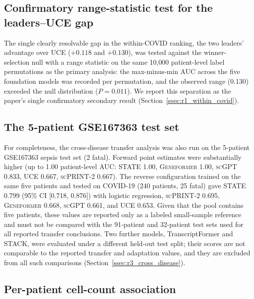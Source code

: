 \documentclass[11pt,a4paper]{article}
\newcommand{\model}[1]{\textsc{#1}}
\begin{document}
\subsection{Confirmatory range-statistic test for the leaders--UCE gap}
\label{sn:range_test}

The single clearly resolvable gap in the within-COVID ranking, the two
leaders' advantage over \model{UCE} ($+0.118$ and $+0.130$), was tested
against the winner-selection null with a range statistic on the same 10{,}000
patient-level label permutations as the primary analysis: the max-minus-min
AUC across the five foundation models was recorded per permutation, and the
observed range (0.130) exceeded the null distribution
($P = 0.011$). We report this separation as the paper's single confirmatory
secondary result (Section~\ref{ssec:r1_within_covid}).

\subsection{The 5-patient GSE167363 test set}
\label{sn:gse167363_testset}

For completeness, the cross-disease transfer analysis was also run on the
5-patient GSE167363 sepsis test set (2 fatal). Forward point estimates were
substantially higher (up to 1.00 patient-level AUC: \model{STATE} 1.00,
\model{Geneformer} 1.00, \model{scGPT} 0.833, \model{UCE} 0.667,
\model{scPRINT-2} 0.667). The reverse configuration trained on the same five
patients and tested on COVID-19 (240 patients, 25 fatal) gave \model{STATE}
0.799 (95\% CI [0.718, 0.876]) with logistic regression, \model{scPRINT-2}
0.695, \model{Geneformer} 0.668, \model{scGPT} 0.661, and \model{UCE} 0.653.
Given that the pool contains five patients, these values are reported only as
a labeled small-sample reference and must not be compared with the 91-patient
and 32-patient test sets used for all reported transfer conclusions. Two further
models, TranscriptFormer \citep{pearce2025transcriptformer} and STACK, were
evaluated under a different held-out test split; their scores are not comparable to the reported transfer and
adaptation values, and they are excluded from all such comparisons
(Section~\ref{ssec:r3_cross_disease}).

\subsection{Per-patient cell-count association}
\label{sn:cellcount}
\end{document}
